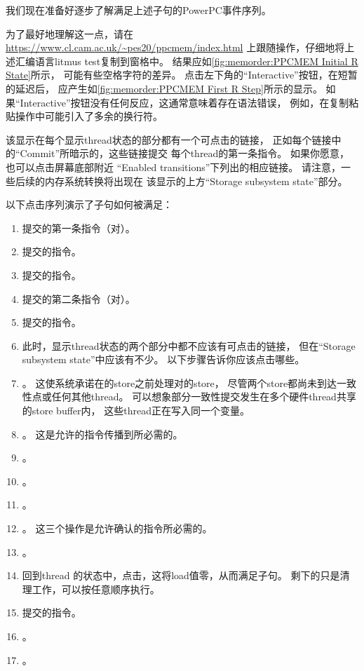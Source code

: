 我们现在准备好逐步了解满足上述子句的PowerPC事件序列。

为了最好地理解这一点，请在
\url{https://www.cl.cam.ac.uk/~pes20/ppcmem/index.html}
上跟随操作，仔细地将上述汇编语言litmus test复制到窗格中。
结果应如\cref{fig:memorder:PPCMEM Initial R State}所示，
可能有些空格字符的差异。
点击左下角的``Interactive''按钮，在短暂的延迟后，
应产生如\cref{fig:memorder:PPCMEM First R Step}所示的显示。
如果``Interactive''按钮没有任何反应，这通常意味着存在语法错误，
例如，在复制粘贴操作中可能引入了多余的换行符。

该显示在每个显示thread状态的部分都有一个可点击的链接，
正如每个链接中的``Commit''所暗示的，这些链接提交
每个thread的第一条指令。
如果你愿意，也可以点击屏幕底部附近
``Enabled transitions''下列出的相应链接。
请注意，一些后续的内存系统转换将出现在
该显示的上方``Storage subsystem state''部分。

以下点击序列演示了子句如何被满足：

\begin{enumerate}
\item	提交的第一条指令（对）。
\item	提交的指令。
\item	提交的指令。
\item	提交的第二条指令（对）。
\item	提交的指令。
\item	此时，显示thread状态的两个部分中都不应该有可点击的链接，
	但在``Storage subsystem state''中应该有不少。
	以下步骤告诉你应该点击哪些。
\item	{}。
	这使系统承诺在的store之前处理对的store，
	尽管两个store都尚未到达一致性点或任何其他thread。
	可以想象部分一致性提交发生在多个硬件thread共享的store buffer内，
	这些thread正在写入同一个变量。
\item	{}。
	这是允许的指令传播到所必需的。
\item	{}。
\item	{}。
\item	{}。
\item	{}。
	这三个操作是允许确认的指令所必需的。
\item	{}。
\item	回到thread 的状态中，点击，这将load值零，从而满足子句。
	剩下的只是清理工作，可以按任意顺序执行。
\item	提交的指令。
\item	{}。
\item	{}。
\end{enumerate}

